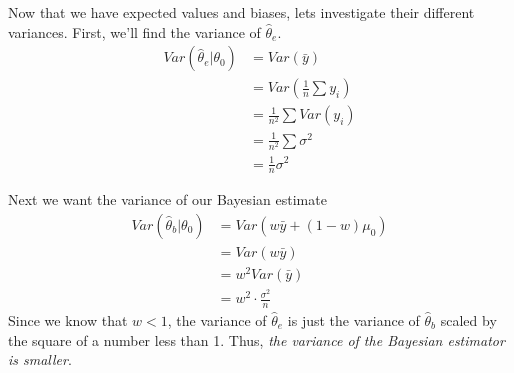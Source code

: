 \documentclass[titlepage, 12pt, leqno]{article}
\begin{document}
Now that we have expected values and biases, lets investigate their different variances.
First, we'll find the variance of $\hat \theta_{e}$.
\begin{align*}
    Var(\hat \theta_{e}|\theta_{0}) &= Var(\bar y)\\
                                    &= Var\left(\frac{1}{n}\sum y_{i}\right)\\
                                    &= \frac{1}{n^{2}}\sum Var(y_{i})\\
                                    &= \frac{1}{n^{2}}\sum \sigma^{2}\\
                                    &= \frac{1}{n}\sigma^{2}
\end{align*}

Next we want the variance of our Bayesian estimate
\begin{align*}
    Var(\hat \theta_{b}|\theta_{0}) &= Var(w\bar y + (1-w)\mu_{0})\\
                                    &= Var(w\bar y)\\
                                    &= w^{2}Var(\bar y)\\
                                    &= w^{2}\cdot \frac{\sigma^{2}}{n}
\end{align*}
Since we know that $w<1$, the variance of $\hat \theta_{e}$ is just the variance of
$\hat \theta_{b}$ scaled by the square of a number less than 1. Thus, \textit{the
variance of the Bayesian estimator is smaller}.
\end{document}
